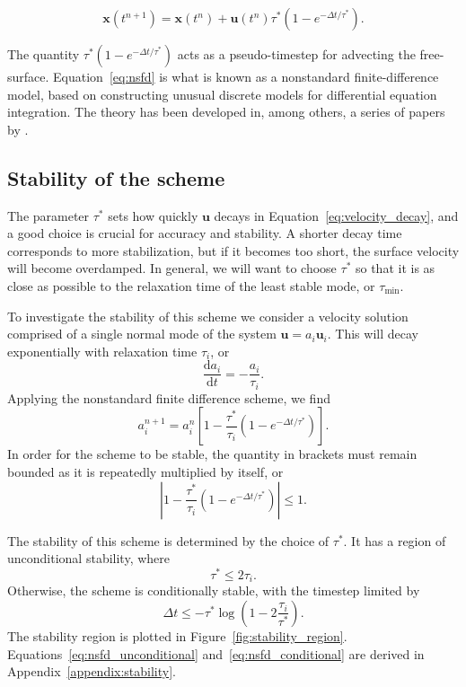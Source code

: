 \documentclass[preprint,12pt,authoryear]{elsarticle}
\begin{document}
\begin{equation}
\mathbf{x}(t^{n+1}) = \mathbf{x}(t^n) + \mathbf{u}(t^{n}) \tau^* \left(1-e^{-\Delta t/\tau^*} \right).
\label{eq:nsfd}
\end{equation}

The quantity $\tau^*(1-e^{-\Delta t / \tau^*})$ acts as a pseudo-timestep for advecting the free-surface.
Equation~\eqref{eq:nsfd} is what is known as a nonstandard finite-difference model, based on
constructing unusual discrete models for differential equation integration.
The theory has been developed in, among others, a series of papers by
\citet{mickens1994nonstandard, mickens2002nonstandard, mickens2005dynamic}.

\subsection{Stability of the scheme}
The parameter $\tau^*$ sets how quickly $\mathbf{u}$ decays in Equation~\eqref{eq:velocity_decay}, and a good 
choice is crucial for accuracy and stability. A shorter decay time corresponds to more stabilization,
but if it becomes too short, the surface velocity will become overdamped. In general, we will want 
to choose $\tau^*$ so that it is as close as possible to the relaxation time of the least stable mode, or $\tau_{\mathrm{min}}$.

To investigate the stability of this scheme we consider a velocity solution comprised of 
a single normal mode of the system $\mathbf{u} = a_i \mathbf{u}_i$.
This will decay exponentially with relaxation time $\tau_i$, or
\begin{equation}
\frac{\text{d} a_i} {\text{d}t} = - \frac{ a_i }{\tau_i}.
\end{equation}
Applying the nonstandard finite difference scheme, we find
\begin{equation}
a_i^{n+1} = a_i^{n} \left[ 1 - \frac{\tau^*}{\tau_i} \left(1-e^{-\Delta t/\tau^*} \right) \right].
\label{eq:recursion}
\end{equation}
In order for the scheme to be stable, the quantity in brackets must remain bounded as it is repeatedly multiplied by itself, or 
\begin{equation}
\left| 1 - \frac{\tau^*}{\tau_i} \left(1-e^{-\Delta t/\tau^*} \right) \right| \le 1.
\label{eq:stability_condition}
\end{equation}

The stability of this scheme is determined by the choice of $\tau^*$.  
It has a region of unconditional stability, where
\begin{equation}
\tau^* \le 2 \tau_i.
\label{eq:nsfd_unconditional}
\end{equation}
Otherwise, the scheme is conditionally stable, with the timestep limited by 
\begin{equation}
\Delta t \le -\tau^* \log \left(1 - 2 \frac{\tau_i}{\tau^*} \right).
\label{eq:nsfd_conditional}
\end{equation}
The stability region is plotted in Figure~\ref{fig:stability_region}. Equations~\eqref{eq:nsfd_unconditional} and~\eqref{eq:nsfd_conditional}
are derived in Appendix~\ref{appendix:stability}.
\end{document}

